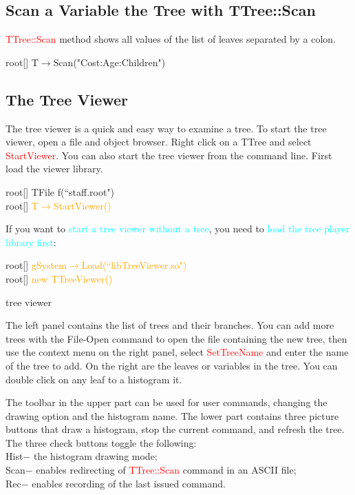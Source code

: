 \documentclass[12pt,a4paper]{article}
\begin{document}
\subsection{Scan a Variable the Tree with TTree::Scan}

\textcolor{red}{TTree::Scan} method shows all values of the list of leaves separated by a colon.

root[] T$\rightarrow$Scan("Cost:Age:Children")


\subsection{The Tree Viewer}
The tree viewer is a quick and easy way to examine a tree. To start the tree viewer, open a file and object browser. Right click on a TTree and select \textcolor{red}{StartViewer}. You can also start the tree viewer from the command line. First load the viewer library.

root[] TFile f(``staff.root") \\
root[] \textcolor{orange}{T$\rightarrow$StartViewer()}

If you want to \textcolor{cyan}{start a tree viewer without a tree}, you need to \textcolor{cyan}{load the tree player library first}:

root[] \textcolor{orange}{gSystem$\rightarrow$Load(``libTreeViewer.so")} \\
root[] \textcolor{orange}{new TTreeViewer()}

tree viewer

The left panel contains the list of trees and their branches. You can add more trees with the File-Open command to open the file containing the new tree, then use the context menu on the right panel, select \textcolor{red}{SetTreeName} and enter the name of the tree to add. On the right are the leaves or variables in the tree. You can double click on any leaf to a histogram it.

The toolbar in the upper part can be used for user commands, changing the drawing option and the histogram name. The lower part contains three picture buttons that draw a histogram, stop the current command, and refresh the tree. The three check buttons toggle the following: \\
Hist$-$ the histogram drawing mode; \\
Scan$-$ enables redirecting of \textcolor{red}{TTree::Scan} command in an ASCII file; \\
Rec$-$ enables recording of the last issued command. \\
\end{document}
